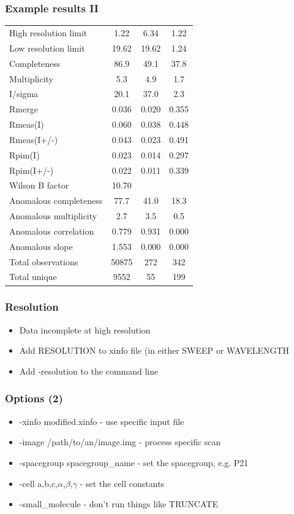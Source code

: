 \documentclass[slides,compress]{beamer}
\begin{document}
\begin{frame}
\frametitle{Example results II}
\begin{tabular}{lccc}
High resolution limit         &         1.22 &  6.34 &  1.22 \\
Low resolution limit          &        19.62 & 19.62 &  1.24 \\
Completeness                  &         86.9 &  49.1 &  37.8 \\
Multiplicity                  &        5.3  &  4.9   & 1.7 \\
I/sigma                       &        20.1 &  37.0  &  2.3 \\
Rmerge                        &       0.036 & 0.020  &0.355 \\
Rmeas(I)                      &       0.060 & 0.038  &0.448 \\
Rmeas(I+/-)                   &       0.043 & 0.023  &0.491 \\
Rpim(I)                       &       0.023 & 0.014  &0.297 \\
Rpim(I+/-)                    &       0.022 & 0.011  &0.339 \\
Wilson B factor               &       10.70& \\
Anomalous completeness        &        77.7  & 41.0  & 18.3 \\
Anomalous multiplicity        &         2.7  &  3.5  &  0.5 \\
Anomalous correlation         &        0.779 & 0.931 & 0.000 \\
Anomalous slope               &       1.553  &0.000 & 0.000 \\
Total observations            &       50875  &272   & 342 \\
Total unique                  &       9552   &55    & 199 \\
\end{tabular}
\end{frame}

\begin{frame}
\frametitle{Resolution}
\begin{itemize}
\item{Data incomplete at high resolution}
\item{Add RESOLUTION to xinfo file (in either SWEEP or WAVELENGTH}
\item{Add -resolution to the command line}
\end{itemize}
\end{frame}

\begin{frame}
\frametitle{Options (2)}
\begin{itemize}
\item{-xinfo modified.xinfo - use specific input file}
\item{-image /path/to/an/image.img - process specific scan}
\item{-spacegroup spacegroup\_name - set the spacegroup, e.g. P21}
\item{-cell a,b,c,$\alpha$,$\beta$,$\gamma$ - set the cell constants} 
\item{-small\_molecule - don't run things like TRUNCATE}
\end{itemize}
\end{frame}
\end{document}
